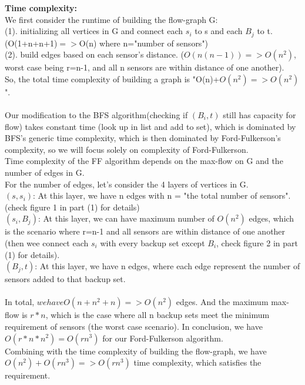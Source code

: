 \documentclass{assignment-373}
\begin{document}
\begin{enumerate}
    \textbf{Time complexity:}\\
    \phantom{=} \phantom{=} We first consider the runtime of building the flow-graph G:\\
    \phantom{=} \phantom{=}\phantom{=} (1). initializing all vertices in G and connect each $s_i$ to s and each $B_j$ to t. (O(1+n+n+1)$=>$O(n) where n="number of sensors")\\
    \phantom{=} \phantom{=}\phantom{=} (2). build edges based on each sensor's distance. ($O(n(n-1))=>O(n^2)$, worst case being r=n-1, and all n sensors are within distance of one another).\\
    \phantom{=} \phantom{=} So, the total time complexity of building a graph is "O(n)+$O(n^2)=>O(n^2)$".\\
    \\
    \phantom{=} \phantom{=}Our modification to the BFS algorithm(checking if $(B_i, t)$ still has capacity for flow) takes constant time (look up in list and add to set), which is dominated by BFS's generic time complexity, which is then dominated by Ford-Fulkerson's complexity, so we will focus solely on complexity of Ford-Fulkerson.\\
    Time complexity of the FF algorithm depends on the max-flow on G and the number of edges in G. \\
    \phantom{=} \phantom{=}For the number of edges, let's consider the 4 layers of vertices in G.\\
    \phantom{=} \phantom{=}\phantom{=} $(s,s_i)$:   At this layer, we have n edges with n = "the total number of sensors". (check figure 1 in part (1) for details)\\
    \phantom{=} \phantom{=}\phantom{=} $(s_i,B_j)$: At this layer, we can have maximum number of $O(n^2)$ edges, which is the scenario where r=n-1 and all sensors are within distance of one another (then wee connect each $s_i$ with every backup set except $B_i$, check figure 2 in part (1) for details).\\
    \phantom{=} \phantom{=}\phantom{=} $(B_j,t)$: At this layer, we have n edges, where each edge represent the number of sensors added to that backup set.\\
    \\
    In total, $we have O(n + n^2 + n) = > O(n^2)$ edges. And the maximum max-flow is $r*n$, which is the case where all n backup sets meet the minimum requirement of sensors (the worst case scenario). In conclusion, we have $O(r*n*n^2) = O(rn^3)$ for our Ford-Fulkerson algorithm.\\
    
    Combining with the time complexity of building the flow-graph, we have $O(n^2)+O(rn^3)=>O(rn^3)$ time complexity, which satisfies the requirement.\\

\end{enumerate}
\end{document}
